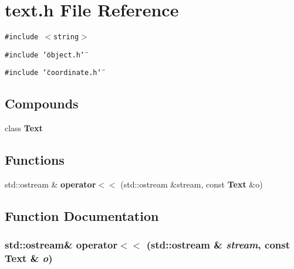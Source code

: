 \section{text.h File Reference}
\label{text_8h}
{\tt \#include $<$string$>$}\par
{\tt \#include \char`\"{}object.h\char`\"{}}\par
{\tt \#include \char`\"{}coordinate.h\char`\"{}}\par
\subsection*{Compounds}
\begin{CompactItemize}
\item 
class {\bf Text}
\end{CompactItemize}
\subsection*{Functions}
\begin{CompactItemize}
\item 
std::ostream \& {\bf operator$<$$<$} (std::ostream \&stream, const {\bf Text} \&o)
\end{CompactItemize}


\subsection{Function Documentation}
\subsubsection{\setlength{\rightskip}{0pt plus 5cm}std::ostream\& operator$<$$<$ (std::ostream \& {\em stream}, const {\bf Text} \& {\em o})\hspace{0.3cm}{\tt  [inline]}}\label{text_8h_a0}


